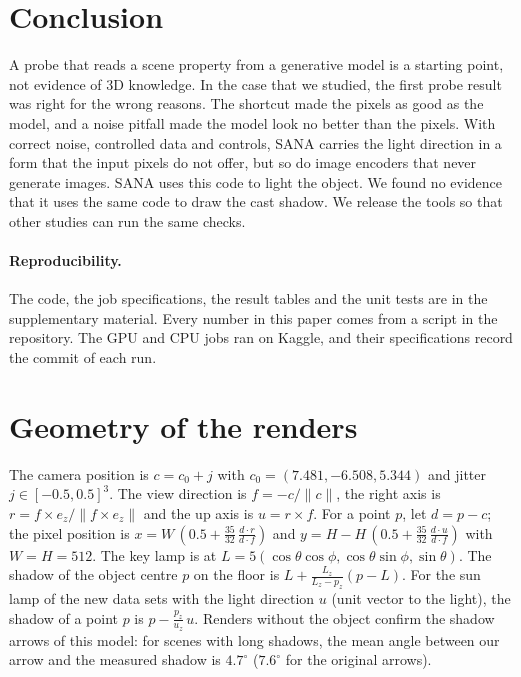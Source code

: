 \documentclass[10pt]{article}
\newcommand{\degr}{^\circ}
\begin{document}
\section{Conclusion}
A probe that reads a scene property from a generative model is a starting point, not evidence of 3D knowledge.
In the case that we studied, the first probe result was right for the wrong reasons. The shortcut made the pixels as good as the model, and a noise pitfall made the model look no better than the pixels.
With correct noise, controlled data and controls, SANA carries the light direction in a form that the input pixels do not offer, but so do image encoders that never generate images.
SANA uses this code to light the object. We found no evidence that it uses the same code to draw the cast shadow.
We release the tools so that other studies can run the same checks.

\paragraph{Reproducibility.}
The code, the job specifications, the result tables and the unit tests are in the supplementary material.
Every number in this paper comes from a script in the repository. The GPU and CPU jobs ran on Kaggle, and their specifications record the commit of each run.




\appendix
\section{Geometry of the renders}
\label{app:geometry}
The camera position is $c=c_0+j$ with $c_0=(7.481,-6.508,5.344)$ and jitter $j\in[-0.5,0.5]^3$.
The view direction is $f=-c/\lVert c\rVert$, the right axis is $r=f\times e_z/\lVert f\times e_z\rVert$ and the up axis is $u=r\times f$.
For a point $p$, let $d=p-c$; the pixel position is $x=W\,(0.5+\tfrac{35}{32}\,\tfrac{d\cdot r}{d\cdot f})$ and $y=H-H\,(0.5+\tfrac{35}{32}\,\tfrac{d\cdot u}{d\cdot f})$ with $W=H=512$.
The key lamp is at $L=5(\cos\theta\cos\phi,\cos\theta\sin\phi,\sin\theta)$.
The shadow of the object centre $p$ on the floor is $L+\tfrac{L_z}{L_z-p_z}(p-L)$.
For the sun lamp of the new data sets with the light direction $u$ (unit vector to the light), the shadow of a point $p$ is $p-\tfrac{p_z}{u_z}\,u$.
Renders without the object confirm the shadow arrows of this model: for scenes with long shadows, the mean angle between our arrow and the measured shadow is $4.7\degr$ ($7.6\degr$ for the original arrows).
\end{document}
